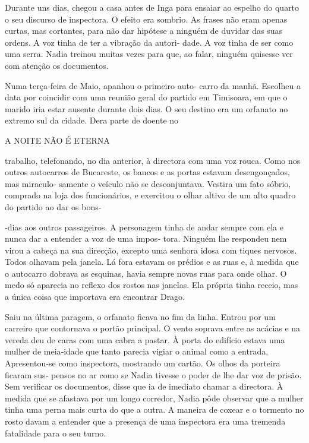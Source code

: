 Durante uns dias, chegou a casa antes de Inga para ensaiar ao espelho do
quarto o seu discurso de inspectora. O efeito era sombrio. As frases não
eram apenas curtas, mas cortantes, para não dar hipótese a ninguém de
duvidar das suas ordens. A voz tinha de ter a vibração da autori‑ dade.
A voz tinha de ser como uma serra. Nadia treinou muitas vezes para que,
ao falar, ninguém quisesse ver com atenção os documentos.

Numa terça‑feira de Maio, apanhou o primeiro auto‑ carro da manhã.
Escolheu a data por coincidir com uma reunião geral do partido em
Timisoara, em que o marido iria estar ausente durante dois dias. O seu
destino era um orfanato no extremo sul da cidade. Dera parte de doente
no

A NOITE NÃO É ETERNA

trabalho, telefonando, no dia anterior, à directora com uma voz rouca.
Como nos outros autocarros de Bucareste, os bancos e as portas estavam
desengonçados, mas miraculo‑ samente o veículo não se desconjuntava.
Vestira um fato sóbrio, comprado na loja dos funcionários, e exercitou o
olhar altivo de um alto quadro do partido ao dar os bons‑

‑dias aos outros passageiros. A personagem tinha de andar sempre com ela
e nunca dar a entender a voz de uma impos‑ tora. Ninguém lhe respondeu
nem virou a cabeça na sua direcção, excepto uma senhora idosa com tiques
nervosos. Todos olhavam pela janela. Lá fora estavam os prédios e as
ruas e, à medida que o autocarro dobrava as esquinas, havia sempre novas
ruas para onde olhar. O medo só aparecia no reflexo dos rostos nas
janelas. Ela própria tinha receio, mas a única coisa que importava era
encontrar Drago.

Saiu na última paragem, o orfanato ficava no fim da linha. Entrou por um
carreiro que contornava o portão principal. O vento soprava entre as
acácias e na vereda deu de caras com uma cabra a pastar. À porta do
edifício estava uma mulher de meia‑idade que tanto parecia vigiar o
animal como a entrada. Apresentou‑se como inspectora, mostrando um
cartão. Os olhos da porteira ficaram sus‑ pensos no ar como se Nadia
tivesse o poder de lhe dar voz de prisão. Sem verificar os documentos,
disse que ia de imediato chamar a directora. À medida que se afastava
por um longo corredor, Nadia pôde observar que a mulher tinha uma perna
mais curta do que a outra. A maneira de coxear e o tormento no rosto
davam a entender que a presença de uma inspectora era uma tremenda
fatalidade para o seu turno.

